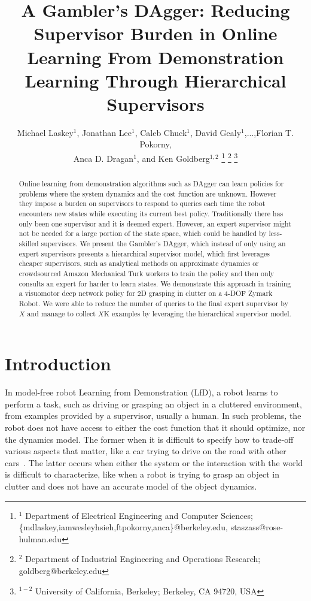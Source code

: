 \documentclass[10pt, conference]{ieeeconf}      %
\title{A Gambler's DAgger: Reducing Supervisor Burden in Online Learning From Demonstration Learning  Through Hierarchical Supervisors}
\author{Michael Laskey$^1$, Jonathan Lee$^1$, Caleb Chuck$^1$, David Gealy$^1$,...,Florian T. Pokorny,\\
 Anca D. Dragan$^1$, and Ken Goldberg$^{1,2}$%
\thanks{$^1$ Department of Electrical Engineering and Computer Sciences; {\small \{mdlaskey,iamwesleyhsieh,ftpokorny,anca\}@berkeley.edu, \small staszass@rose-hulman.edu} }%
\thanks{$^2$ Department of Industrial Engineering and Operations Research; {\small goldberg@berkeley.edu}}%
\thanks{$^{1-2}$ University of California, Berkeley;  Berkeley, CA 94720, USA}%
}
\begin{document}
\maketitle
\thispagestyle{empty}
\pagestyle{empty}



\begin{abstract}
Online learning from demonstration algorithms such as
DAgger can learn policies for problems where the system dynamics and
the cost function are unknown. However they impose a
burden on supervisors to respond to queries each time the robot
encounters new states while executing its current best policy.  Traditionally there has only been one supervisor and it is deemed expert. However, an expert supervisor might not be needed for a large portion of the state space, which could be handled by less-skilled supervisors. We present the Gambler's DAgger, which instead of only using an expert supervisors presents a hierarchical supervisor model, which first leverages cheaper supervisors, such as analytical methods on approximate dynamics or crowdsourced Amazon Mechanical Turk workers to train the policy and then only consults an expert for harder to learn states. We demonstrate this approach in training a visuomotor deep network policy for 2D grasping in clutter on a 4-DOF Zymark Robot. We were able to reduce the number of queries to the final expert supervisor by $X$ and manage to collect $X$K examples by leveraging the hierarchical supervisor model. 
 \end{abstract}



\section{Introduction} 
In model-free robot Learning from Demonstration (LfD), a robot learns to perform a task, such as driving or grasping an object in a cluttered environment, from examples provided by a  supervisor, usually a human.  In such problems, the robot does not have access to either the cost function that it should optimize, nor the dynamics model. The former  when it is difficult to specify how to trade-off various aspects that matter, like a car trying to drive on the road with other cars~\cite{abbeel2004apprenticeship}.  The latter occurs when either the system or the interaction with the world is difficult to characterize, like when a robot is trying to grasp an object in clutter and does not have an accurate model of the object dynamics. 
\end{document}
